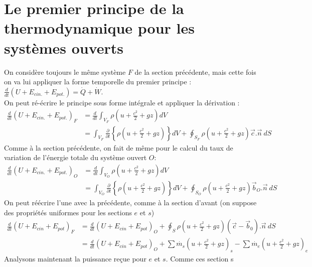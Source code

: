\section{Le premier principe de la thermodynamique pour les systèmes 
ouverts}
\label{sec:premierprincipesysouverts}
On considère toujours le même système $F$ de la section précédente, mais 
cette fois on va lui appliquer la forme temporelle du premier principe :
$\frac{d}{dt}\left(U + E_{cin.} + E_{pot.}\right) = \dot{Q}+\dot{W}$. \\
On peut ré-écrire le principe sous forme intégrale et appliquer la 
dérivation :
\begin{equation}
\begin{split}
\frac{d}{dt}\left(U + E_{cin.} + E_{pot.}\right)_F &=
 \frac{d}{dt}\int_{V_F} \rho\left(u+\frac{c^2}{2}+gz\right)dV\\
& = \int_{V_F}\frac{\partial}{\partial t}\left\{\rho
\left(u+\frac{c^2}{2}+gz\right)\right\}dV + \oint_{S_F}\rho\left(u+\frac{
c^2}{2}+gz\right)\vec{c}.\vec{n}\ dS
\end{split}
\end{equation}
Comme à la section précédente, on fait de même pour le calcul du taux 
de variation de l'énergie totale du système ouvert $O$:
\begin{equation}
\begin{split}
\frac{d}{dt}\left(U + E_{cin.} + E_{pot.}\right)_O &=
 \frac{d}{dt}\int_{V_O} \rho\left(u+\frac{c^2}{2}+gz\right)dV\\
& = \int_{V_O}\frac{\partial}{\partial t}\left\{\rho
\left(u+\frac{c^2}{2}+gz\right)\right\}dV + \oint_{S_O}\rho\left(u+\frac{
c^2}{2}+gz\right)\vec{b}_O.\vec{n}\ dS
\end{split}
\end{equation}
On peut réécrire l'une avec la précédente, comme à la section d'avant (on 
suppose des propriétés uniformes pour les sections $e$ et $s$)
\begin{equation}
\begin{split}
\frac{d}{dt}\left(U+E_{cin}+E_{pot}\right)_F &= \frac{d}{dt}\left(U+E_{cin}+
E_{pot}\right)_O + \oint_S\rho\left(u+\frac{c^2}{2}+gz\right)(\vec{c}-\vec{b}_0)
.\vec{n}\ dS\\
&= \frac{d}{dt}\left(U+E_{cin}+E_{pot}\right)_O + \sum \dot{m_s}\left(
u+\frac{c^2}{2}+gz\right)_s -\sum \dot{m_e}\left(u+\frac{c^2}{2}+gz\right)_e
\end{split}
\end{equation}
Analysons maintenant la puissance reçue pour $e$ et $s$. Comme ces section s
